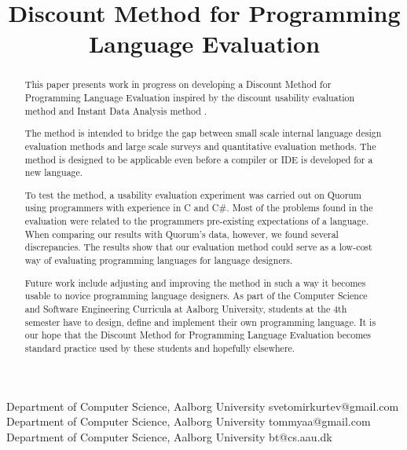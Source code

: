 \documentclass[preprint,10pt]{sigplanconf}
\begin{document}
\setlength{\pdfpageheight}{\paperheight}
\setlength{\pdfpagewidth}{\paperwidth}




\title{Discount Method for Programming Language Evaluation}

           {Department of Computer Science, Aalborg University}
           {svetomirkurtev@gmail.com}
           {Department of Computer Science, Aalborg University}
           {tommyaa@gmail.com}
           {Department of Computer Science, Aalborg University}
           {bt@cs.aau.dk}          

\maketitle

\begin{abstract}
This paper presents work in progress on developing a Discount Method for Programming Language Evaluation inspired by the discount usability evaluation method \cite{CooperativeEval} and Instant Data Analysis method \cite{IDA}.

The method is intended to bridge the gap between small scale internal language design evaluation methods and large scale surveys and quantitative evaluation methods. The method is designed to be applicable even before a compiler or IDE is developed for a new language.

To test the method, a usability evaluation experiment was carried out on Quorum using programmers with experience in C and C\#. Most of the problems found in the evaluation were related to the programmers pre-existing expectations of a language. When comparing our results with Quorum’s data, however, we found several discrepancies.  The results show that our evaluation method could serve as a low-cost way of evaluating programming languages for language designers. 

Future work include adjusting and improving the method in such a way it becomes usable to novice programming language designers. As part of the Computer Science and Software Engineering Curricula at Aalborg University, students at the 4th semester have to design, define and implement their own programming language. It is our hope that the Discount Method for Programming Language Evaluation becomes standard practice used by these students and hopefully elsewhere.
\end{abstract}
\end{document}
